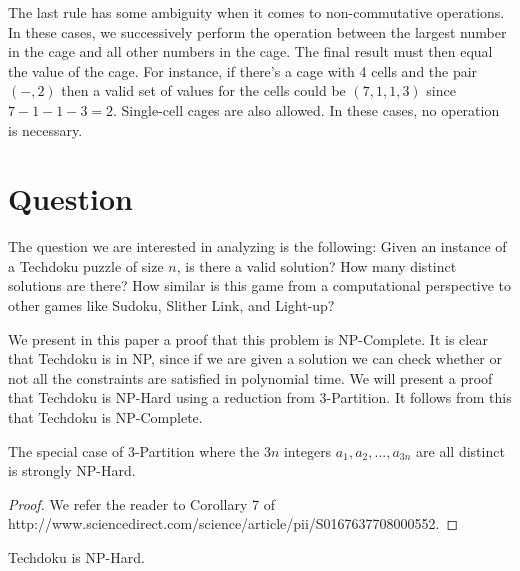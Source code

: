 \documentclass[runningheads,a4paper]{llncs}
\begin{document}
The last rule has some ambiguity when it comes to non-commutative operations. In these cases, we successively perform the operation between the largest number in the cage and all other numbers in the cage. The final result must then equal the value of the cage. For instance, if there's a cage with 4 cells and the pair $(-, 2)$ then a valid set of values for the cells could be $(7, 1, 1, 3)$ since $7 - 1 - 1 - 3 = 2$. Single-cell cages are also allowed. In these cases, no operation is necessary. 

\section{Question}

The question we are interested in analyzing is the following: Given an instance of a Techdoku puzzle of size $n$, is there a valid solution? How many distinct solutions are there? How similar is this game from a computational perspective to other games like Sudoku, Slither Link, and Light-up?

We present in this paper a proof that this problem is NP-Complete. It is clear that Techdoku is in NP, since if we are given a solution we can check whether or not all the constraints are satisfied in polynomial time. We will present a proof that Techdoku is NP-Hard using a reduction from 3-Partition. It follows from this that Techdoku is NP-Complete. 

\begin{lemma}
The special case of 3-Partition where the $3n$ integers $a_1, a_2, ... , a_{3n}$ are all distinct is strongly NP-Hard.
\end{lemma}

\begin{proof}
We refer the reader to Corollary 7 of http://www.sciencedirect.com/science/article/pii/S0167637708000552.
\end{proof}

\begin{theorem} 
Techdoku is NP-Hard.
\end{theorem}
\end{document}
